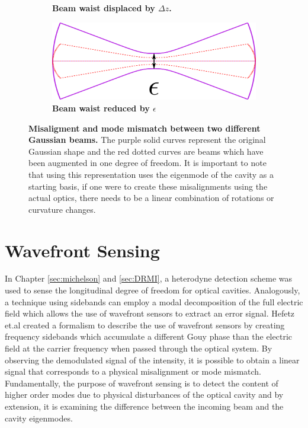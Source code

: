 \begin{figure}
\begin{subfigure}[b]{0.475\textwidth}
				\caption[]{\textbf{Beam waist displaced by $\Delta z$.}}    
				\label{fig:BeamWaistDisplaced}
			\end{subfigure}
			\quad
			\begin{subfigure}[b]{0.475\textwidth}   
				\centering 
				\includegraphics[width=\textwidth]{../Figures/BeamWaistEnlarged.png}
				\caption[]{\textbf{Beam waist reduced by $\epsilon$}}    
				\label{fig:BeamWaistEnlarged}
			\end{subfigure}
			\caption[Misaligment and mode mismatch between two different Gaussian beams.]  
			{\textbf{Misaligment and mode mismatch between two different Gaussian beams.}
				The purple solid curves represent the original Gaussian shape and the red dotted curves are beams which have been augmented in one degree of freedom.  It is important to note that using this representation uses the eigenmode of the cavity as a starting basis, if one were to create these misalignments using the actual optics, there needs to be a linear combination of rotations or curvature changes.
			}
		\end{figure}
		
		\section{Wavefront Sensing}\label{WFS}
		In Chapter \ref{sec:michelson} and \ref{sec:DRMI}, a heterodyne detection scheme was used to sense the longitudinal degree of freedom for optical cavities.  Analogously, a technique using sidebands can employ a modal decomposition of the full electric field which allows the use of wavefront sensors to extract an error signal.  Hefetz et.al \cite{HefetzWFS} created a formalism to describe the use of wavefront sensors by creating frequency sidebands which accumulate a different Gouy phase than the electric field at the carrier frequency when passed through the optical system.  By observing the demodulated signal of the intensity, it is possible to obtain a linear signal that corresponds to a physical misalignment or mode mismatch.  Fundamentally, the purpose of wavefront sensing is to detect the content of higher order modes due to physical disturbances of the optical cavity and by extension, it is examining the difference between the incoming beam and the cavity eigenmodes.
		
